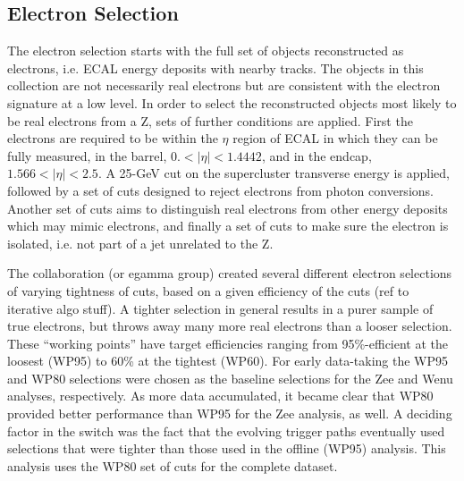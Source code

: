 \subsection{Electron Selection}
The electron selection starts with the full set of objects reconstructed as electrons, 
i.e. ECAL energy deposits with nearby tracks.  
The objects in this collection are not necessarily real electrons 
but are consistent with the electron signature at a low level.  
In order to select the reconstructed objects most likely to be real electrons from a Z, 
sets of further conditions are applied.  
First the electrons are required to be within the $\eta$ region of ECAL in which 
they can be fully measured, in the barrel, $0. < |\eta| < 1.4442$, 
and in the endcap, $1.566 < |\eta| < 2.5$.  
A 25-GeV cut on the supercluster transverse energy is applied,
followed by a set of cuts designed to reject electrons from photon conversions.  
Another set of cuts aims to distinguish real electrons from other energy deposits which may mimic electrons, 
and finally a set of cuts to make sure the electron is isolated, i.e. not part of a jet unrelated to the Z.  

The collaboration (or egamma group) created several different electron selections of varying tightness of cuts,
based on a given efficiency of the cuts (ref to iterative algo stuff).  
A tighter selection in general results in a purer sample of true electrons, but throws away many more
real electrons than a looser selection.  
These ``working points'' have target efficiencies ranging from 95\%-efficient at the loosest (WP95) to 60\% at the tightest (WP60).  
For early data-taking the WP95 and WP80 selections were chosen as the baseline selections for the Zee and Wenu analyses, respectively.
As more data accumulated, it became clear that WP80 provided better performance than WP95 for the Zee analysis, as well.  
A deciding factor in the switch was the fact that the evolving trigger paths eventually used selections that were
tighter than those used in the offline (WP95) analysis.  
This analysis uses the WP80 set of cuts for the complete dataset.  


